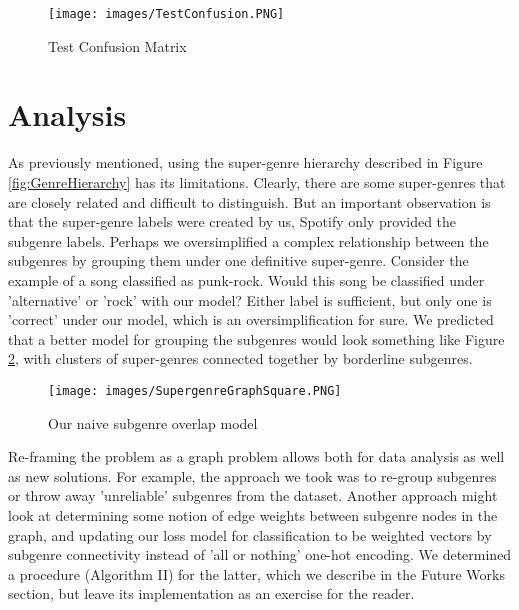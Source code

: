 \documentclass[conference]{IEEEtran}
\begin{document}
\begin{figure}[htbp]
\centerline{\texttt{[image: images/TestConfusion.PNG]}}
\caption{Test Confusion Matrix}
\label{fig:TestConfusion}
\end{figure}

\section{Analysis}
As previously mentioned, using the super-genre hierarchy described in Figure \ref{fig:GenreHierarchy} has its limitations. Clearly, there are some super-genres that are closely related and difficult to distinguish. But an important observation is that the super-genre labels were created by us, Spotify only provided the subgenre labels. Perhaps we oversimplified a complex relationship between the subgenres by grouping them under one definitive super-genre. Consider the example of a song classified as punk-rock. Would this song be classified under 'alternative' or 'rock' with our model? Either label is sufficient, but only one is 'correct' under our model, which is an oversimplification for sure. We predicted that a better model for grouping the subgenres would look something like Figure \ref{fig:NaiveOverlap}, with clusters of super-genres connected together by borderline subgenres.

\begin{figure}[htbp]
\centerline{\texttt{[image: images/SupergenreGraphSquare.PNG]}}
\caption{Our naive subgenre overlap model}
\label{fig:NaiveOverlap}
\end{figure}

Re-framing the problem as a graph problem allows both for data analysis as well as new solutions. For example, the approach we took was to re-group subgenres or throw away 'unreliable' subgenres from the dataset. Another approach might look at determining some notion of edge weights between subgenre nodes in the graph, and updating our loss model for classification to be weighted vectors by subgenre connectivity instead of 'all or nothing' one-hot encoding. We determined a procedure (Algorithm II) for the latter, which we describe in the Future Works section, but leave its implementation as an exercise for the reader.
\end{document}
